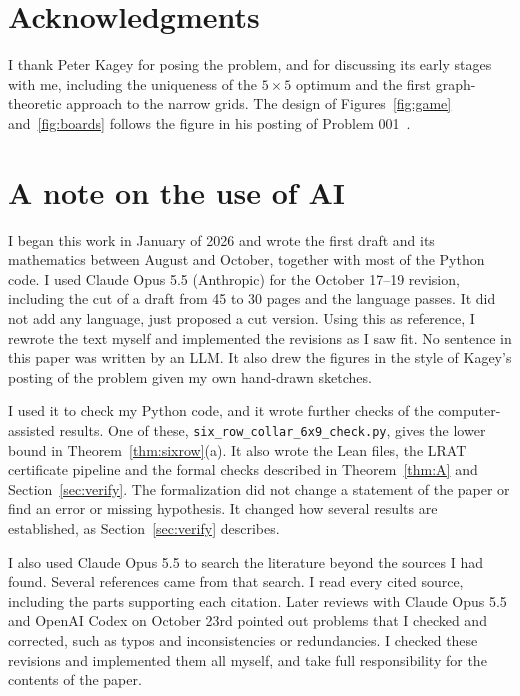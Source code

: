 \section{Acknowledgments}\label{sec:ack}

I thank Peter Kagey for posing the problem, and for discussing its early stages with me,
including the uniqueness of the $5\times5$ optimum and the first graph-theoretic approach to
the narrow grids. The design of Figures~\ref{fig:game} and~\ref{fig:boards} follows the figure
in his posting of Problem 001~\cite{kagey001}.

\section*{A note on the use of AI}

I began this work in January of 2026 and wrote the first draft and its mathematics
between August and October, together with most of the Python code. I used
Claude Opus 5.5 (Anthropic) for the October 17--19 revision, including the
cut of a draft from 45 to 30 pages and the language passes.
It did not add any language, just proposed a cut version.
Using this as reference, I rewrote the text myself and implemented the revisions as I saw fit.
No sentence in this paper was written by an LLM.
It also drew the figures in the style of Kagey's posting of the problem given my own hand-drawn sketches.

I used it to check my Python code, and it wrote further checks of the
computer-assisted results. One of these, \texttt{six\_row\_collar\_6x9\_check.py},
gives the lower bound in Theorem~\ref{thm:sixrow}(a).
It also wrote the Lean files, the LRAT certificate pipeline and the formal
checks described in Theorem~\ref{thm:A} and Section~\ref{sec:verify}.
The formalization did not change a statement of the paper or find an error
or missing hypothesis. It changed how several results are established,
as Section~\ref{sec:verify} describes.

I also used Claude Opus 5.5 to search the literature beyond the sources I
had found. Several references came from that search. I read every cited
source, including the parts supporting each citation. Later reviews with
Claude Opus 5.5 and OpenAI Codex on October 23rd pointed out problems that I checked and
corrected, such as typos and inconsistencies or redundancies.
I checked these revisions and implemented them all myself, and take full responsibility for the
contents of the paper.
